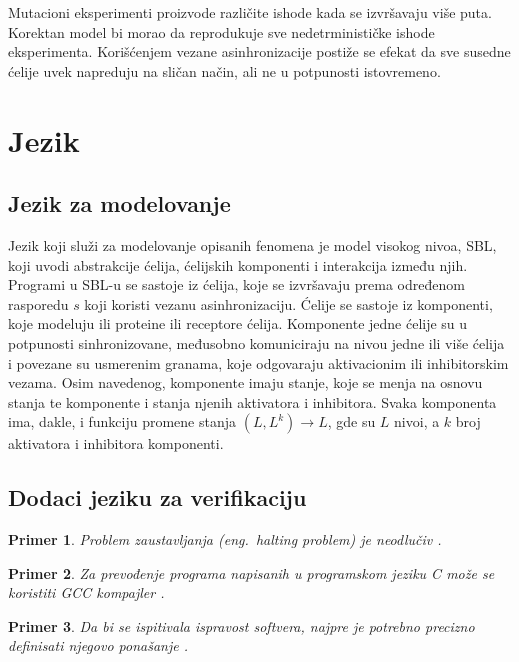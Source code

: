 \documentclass[a4paper]{article}
\newtheorem{primer}{Primer}[section]
\begin{document}
Mutacioni eksperimenti proizvode različite ishode kada se izvršavaju više puta. Korektan model bi morao da reprodukuje sve nedetrminističke ishode eksperimenta. Korišćenjem vezane asinhronizacije postiže se efekat da sve susedne ćelije uvek napreduju na sličan način, ali ne u potpunosti istovremeno. 

\section{Jezik}
\subsection{Jezik za modelovanje}
Jezik koji služi za modelovanje opisanih fenomena je model visokog nivoa, SBL, koji uvodi abstrakcije ćelija, ćelijskih komponenti i interakcija između njih. \\
Programi u SBL-u se sastoje iz ćelija, koje se izvršavaju prema određenom rasporedu $s$ koji koristi vezanu asinhronizaciju. Ćelije se sastoje iz komponenti, koje modeluju ili proteine ili receptore ćelija. Komponente jedne ćelije su u potpunosti sinhronizovane, međusobno komuniciraju na nivou jedne ili više ćelija i povezane su usmerenim granama, koje odgovaraju aktivacionim ili inhibitorskim vezama. Osim navedenog, komponente imaju stanje, koje se menja na osnovu stanja te komponente i stanja njenih aktivatora i inhibitora. Svaka komponenta ima, dakle, i funkciju promene stanja $(L, L^k) \longrightarrow L$, gde su $L$ nivoi, a $k$ broj aktivatora i inhibitora komponenti. 

\subsection{Dodaci jeziku za verifikaciju}



\begin{primer}
Problem zaustavljanja (eng.~{\em halting problem}) je neodlučiv \cite{haltingproblem}.
\end{primer}

\begin{primer}
Za prevođenje programa napisanih u programskom jeziku C može se koristiti GCC kompajler \cite{gcc}.
\end{primer}

\begin{primer}
 Da bi se ispitivala ispravost softvera, najpre je potrebno precizno definisati njegovo ponašanje \cite{laski2009software}. 
\end{primer}
\end{document}
